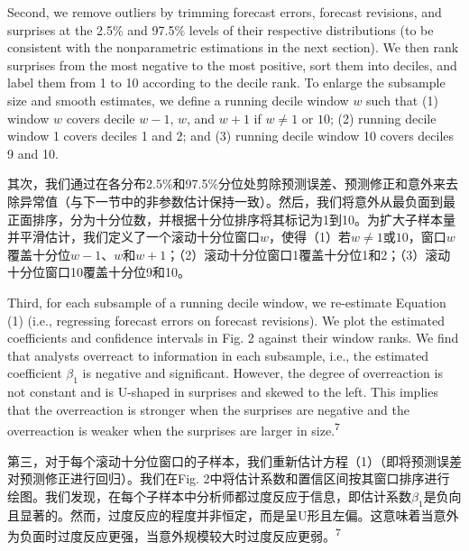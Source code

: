 \documentclass[12pt,a4paper]{article}
\newenvironment{original}
  {\par\medskip\noindent\ignorespaces}
  {\par\medskip}
\newenvironment{translation}
  {\par\noindent{\color{transblue}\ignorespaces}}
  {\par\bigskip}
\begin{document}
\begin{original}
Second, we remove outliers by trimming forecast errors, forecast revisions, and surprises at the 2.5\% and 97.5\% levels of their respective distributions (to be consistent with the nonparametric estimations in the next section). We then rank surprises from the most negative to the most positive, sort them into deciles, and label them from 1 to 10 according to the decile rank. To enlarge the subsample size and smooth estimates, we define a running decile window $w$ such that (1) window $w$ covers decile $w-1$, $w$, and $w+1$ if $w\neq 1$ or $10$; (2) running decile window 1 covers deciles 1 and 2; and (3) running decile window 10 covers deciles 9 and 10.
\end{original}
\begin{translation}
其次，我们通过在各分布2.5\%和97.5\%分位处剪除预测误差、预测修正和意外来去除异常值（与下一节中的非参数估计保持一致）。然后，我们将意外从最负面到最正面排序，分为十分位数，并根据十分位排序将其标记为1到10。为扩大子样本量并平滑估计，我们定义了一个滚动十分位窗口$w$，使得（1）若$w\neq 1$或$10$，窗口$w$覆盖十分位$w-1$、$w$和$w+1$；（2）滚动十分位窗口1覆盖十分位1和2；（3）滚动十分位窗口10覆盖十分位9和10。
\end{translation}

\begin{original}
Third, for each subsample of a running decile window, we re-estimate Equation (1) (i.e., regressing forecast errors on forecast revisions). We plot the estimated coefficients and confidence intervals in Fig. 2 against their window ranks. We find that analysts overreact to information in each subsample, i.e., the estimated coefficient $\beta_1$ is negative and significant. However, the degree of overreaction is not constant and is U-shaped in surprises and skewed to the left. This implies that the overreaction is stronger when the surprises are negative and the overreaction is weaker when the surprises are larger in size.\textsuperscript{7}
\end{original}
\begin{translation}
第三，对于每个滚动十分位窗口的子样本，我们重新估计方程（1）（即将预测误差对预测修正进行回归）。我们在Fig. 2中将估计系数和置信区间按其窗口排序进行绘图。我们发现，在每个子样本中分析师都过度反应于信息，即估计系数$\beta_1$是负向且显著的。然而，过度反应的程度并非恒定，而是呈U形且左偏。这意味着当意外为负面时过度反应更强，当意外规模较大时过度反应更弱。\textsuperscript{7}
\end{translation}
\end{document}
